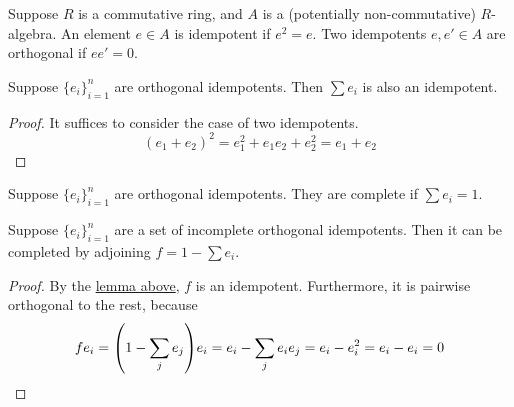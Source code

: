 \begin{definition}
    Suppose \(R\) is a commutative ring, and \(A\) is a (potentially non-commutative) \(R\)-algebra.
    An element \(e \in A\) is idempotent if \(e^2 = e\).
    Two idempotents \(e,e' \in A\) are orthogonal if \(ee' = 0\).
\end{definition}
\begin{lemma}\label{lem:sum-idempotents}
    Suppose \({\{e_i\}}_{i=1}^n\) are orthogonal idempotents.
    Then \(\sum e_i\) is also an idempotent.
\end{lemma}
\begin{proof}
    It suffices to consider the case of two idempotents.
    \begin{equation*}
        {(e_1 + e_2)}^2 = e_1^2 + e_1e_2 + e_2^2 = e_1 + e_2
    \end{equation*}
\end{proof}
\begin{definition}
    Suppose \({\{e_i\}}_{i=1}^n\) are orthogonal idempotents.
    They are complete if \(\sum e_i = 1\).
\end{definition}
\begin{lemma}
    Suppose \({\{e_i\}}_{i=1}^n\) are a set of incomplete orthogonal idempotents.
    Then it can be completed by adjoining \(f = 1 - \sum e_i\).
\end{lemma}
\begin{proof}
    By the \hyperref[lem:sum-idempotents]{lemma above}, \(f\) is an idempotent.
    Furthermore, it is pairwise orthogonal to the rest, because
    \begin{equation*}
        fe_i = \pqty{1 - \sum_j e_j}e_i = e_i - \sum_j e_i e_j = e_i - e_i^2 = e_i - e_i = 0
    \end{equation*}
\end{proof}

